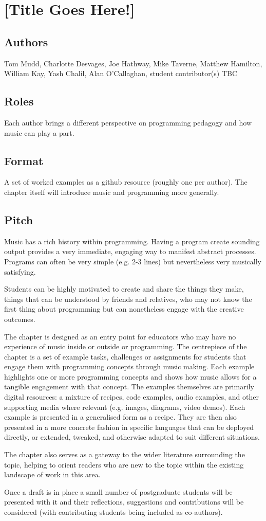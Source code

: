 \section*{[Title Goes Here!]}

\subsection*{Authors}
Tom Mudd, Charlotte Desvages, Joe Hathway, Mike Taverne, Matthew Hamilton, William Kay, Yash Chalil, Alan O'Callaghan, student contributor(s) TBC

\subsection*{Roles}
Each author brings a different perspective on programming pedagogy and how music can play a part.  

\subsection*{Format}
A set of worked examples as a github resource (roughly one per author). The chapter itself will introduce music and programming more generally.

\subsection*{Pitch}
Music has a rich history within programming. Having a program create sounding output provides a very immediate, engaging way to manifest abstract processes. Programs can often be very simple (e.g. 2-3 lines) but nevertheless very musically satisfying. 

Students can be highly motivated to create and share the things they make, things that can be understood by friends and relatives, who may not know the first thing about programming but can nonetheless engage with the creative outcomes.

The chapter is designed as an entry point for educators who may have no experience of music inside or outside or programming. The centrepiece of the chapter is a set of example tasks, challenges or assignments for students that engage them with programming concepts through music making. Each example highlights one or more programming concepts and shows how music allows for a tangible engagement with that concept. The examples themselves are primarily digital resources: a mixture of recipes, code examples, audio examples, and other supporting media where relevant (e.g. images, diagrams, video demos). Each example is presented in a generalised form as a recipe. They are then also presented in a more concrete fashion in specific languages that can be deployed directly, or extended, tweaked, and otherwise adapted to suit different situations.

The chapter also serves as a gateway to the wider literature surrounding the topic, helping to orient readers who are new to the topic within the existing landscape of work in this area.

Once a draft is in place a small number of postgraduate students will be presented with it and their reflections, suggestions and contributions will be considered (with contributing students being included as co-authors).
